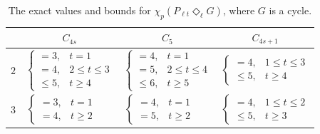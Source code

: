 \documentclass{article}
\begin{document}
\begin{table}[htb]
\begin{center}
\caption{The exact values and bounds for $\chi_p(P_{\ell t} \Diamond_{\ell} G)$, where $G$ is a cycle.}\label{tabela2}

\vspace{3mm}
\setlength{\tabcolsep}{12pt}
 {\tabulinesep=1mm
\begin{tabu}{|c|*{3}{c|}}\hline
{} & $C_{4s}$ & $C_5$ & $C_{4s+1}$ \\ \hline

$2$ & $\left\{
\begin{array}{ll}
= 3, & t=1\\
= 4, & 2 \leq t \leq 3\\
\leq 5, & t\geq 4
\end{array}\right.$ & $\left \{
    \begin{array}{ll}
= 4, & t=1\\
= 5, & 2 \leq t\leq 4\\
\leq 6, & t \geq 5
\end{array}\right.$ & $\left\{
\begin{array}{ll}
= 4, & 1\leq t \leq 3\\
\leq 5, & t \geq 4
\end{array}\right.$ \\ \hline

$3$ & $\left\{
\begin{array}{llll}
= 3, & t=1 & &\\
= 4, & t\geq 2 & &
\end{array}\right.$& 
$\left\{
\begin{array}{llll}
= 4, & t=1 & &\\
= 5, & t \geq 2 &  &
\end{array}\right.$ & $\left\{
\begin{array}{ll}
= 4, & 1 \leq t \leq 2 \\
\leq 5, & t \geq 3 
\end{array}\right.$ \\ \hline

\end{tabu}}
\vspace{3mm}
\end{center}
\end{table}
\end{document}
